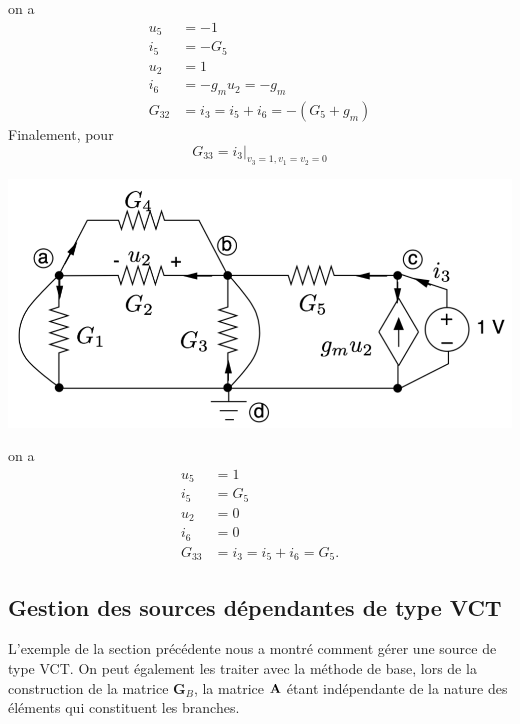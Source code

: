 \begin{testexample}
on a 
\begin{align*}
u_5&=-1 \\
i_5&=-G_5 \\
u_2&=1 \\
i_6&=-g_mu_2=-g_m\\
G_{32} & =  i_{3}= i_5+i_6 =  -(G_5+g_m)
\end{align*}
Finalement, pour \[G_{33}=i_{3}|_{v_{3}=1,v_{1}=v_{2}=0}\]
\begin{center}
	\includegraphics[width=0.7\linewidth]{figs/methodes-generales/ex_exp_3}
\end{center}
on a
\begin{align*}
u_5&=1 \\
i_5&=G_5 \\
u_2&=0 \\
i_6&=0 \\
G_{33} &= i_{3}= i_5+i_6=G_5.
\end{align*}
\end{testexample}


\subsection{Gestion des sources dépendantes de type VCT}
L'exemple de la section précédente nous a montré comment gérer une source de type VCT. On peut également les traiter avec la méthode de base, lors de la construction de la matrice $\mathbf{G}_B$, la matrice ${\bf A}$ étant indépendante de la nature des éléments qui constituent les branches. 


